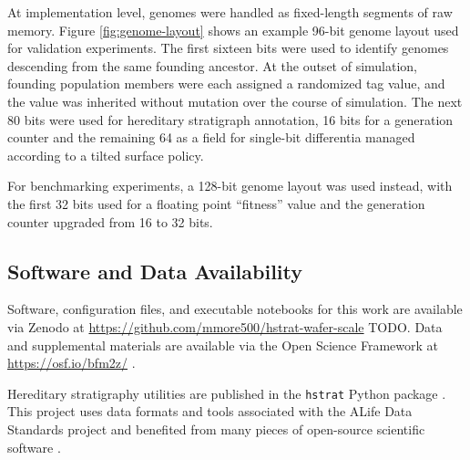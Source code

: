 


At implementation level, genomes were handled as fixed-length segments of raw memory.
Figure \ref{fig:genome-layout} shows an example 96-bit genome layout used for validation experiments.
The first sixteen bits were used to identify genomes descending from the same founding ancestor.
At the outset of simulation, founding population members were each assigned a randomized tag value, and the value was inherited without mutation over the course of simulation.
The next 80 bits were used for hereditary stratigraph annotation, 16 bits for a generation counter and the remaining 64 as a field for single-bit differentia managed according to a tilted surface policy.

For benchmarking experiments, a 128-bit genome layout was used instead, with the first 32 bits used for a floating point ``fitness'' value and the generation counter upgraded from 16 to 32 bits.

\subsection{Software and Data Availability}

Software, configuration files, and executable notebooks for this work are available via Zenodo at \url{https://github.com/mmore500/hstrat-wafer-scale} TODO.
Data and supplemental materials are available via the Open Science Framework at \url{https://osf.io/bfm2z/} \citep{foster2017open}.

Hereditary stratigraphy utilities are published in the \texttt{hstrat} Python package \citep{moreno2022hstrat}.
This project uses data formats and tools associated with the ALife Data Standards project \citep{lalejini2019data} and benefited from many pieces of open-source scientific software \citep{sand2014tqdist,2020SciPy-NMeth,harris2020array,reback2020pandas,mckinney-proc-scipy-2010,sukumaran2010dendropy,cock2009biopython,dolson2024phylotrackpy,torchiano2016effsize,waskom2021seaborn,hunter2007matplotlib,moreno2024apc,moreno2023teeplot,torchiano2016effsize,moreno2024pecking,moreno2024joinem,moreno2024hsurf,moreno2024wse}. %

